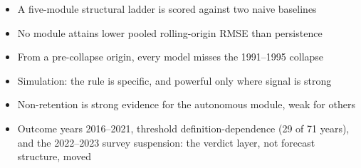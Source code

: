 \documentclass[11pt]{article}
\providecommand{\tightlist}{\setlength{\itemsep}{0pt}\setlength{\parskip}{0pt}}
\begin{document}
\begin{itemize}
\tightlist
\item
  A five-module structural ladder is scored against two naive baselines
\item
  No module attains lower pooled rolling-origin RMSE than persistence
\item
  From a pre-collapse origin, every model misses the 1991--1995 collapse
\item
  Simulation: the rule is specific, and powerful only where signal is strong
\item
  Non-retention is strong evidence for the autonomous module, weak for others
\item
  Outcome years 2016--2021, threshold definition-dependence (29 of 71
  years), and the 2022--2023 survey suspension: the verdict layer, not
  forecast structure, moved
\end{itemize}
\end{document}
